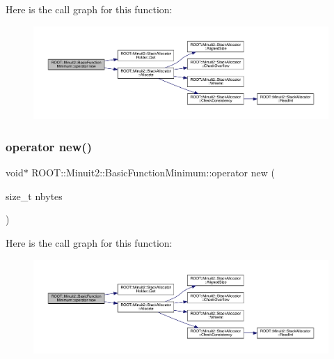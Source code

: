 Here is the call graph for this function\+:
\nopagebreak
\begin{figure}[H]
\begin{center}
\leavevmode
\includegraphics[width=350pt]{de/d25/classROOT_1_1Minuit2_1_1BasicFunctionMinimum_a49a32bdb3ff21202fcfa9a9e42015b8f_cgraph}
\end{center}
\end{figure}
\mbox{\label{classROOT_1_1Minuit2_1_1BasicFunctionMinimum_a49a32bdb3ff21202fcfa9a9e42015b8f}} 
\subsubsection{\texorpdfstring{operator new()}{operator new()}\hspace{0.1cm}{\footnotesize\ttfamily [2/3]}}
{\footnotesize\ttfamily void$\ast$ R\+O\+O\+T\+::\+Minuit2\+::\+Basic\+Function\+Minimum\+::operator new (\begin{DoxyParamCaption}\item[{size\+\_\+t}]{nbytes }\end{DoxyParamCaption})\hspace{0.3cm}{\ttfamily [inline]}}

Here is the call graph for this function\+:
\nopagebreak
\begin{figure}[H]
\begin{center}
\leavevmode
\includegraphics[width=350pt]{de/d25/classROOT_1_1Minuit2_1_1BasicFunctionMinimum_a49a32bdb3ff21202fcfa9a9e42015b8f_cgraph}
\end{center}
\end{figure}
\mbox{\label{classROOT_1_1Minuit2_1_1BasicFunctionMinimum_a49a32bdb3ff21202fcfa9a9e42015b8f}} 
